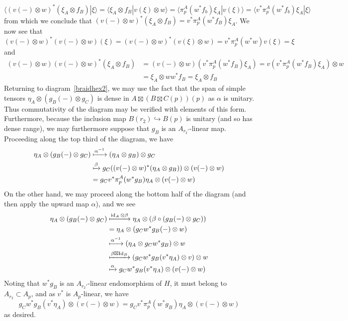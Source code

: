 \documentclass[11pt,reqno]{amsart}
\DeclareMathOperator{\id}{id}
\DeclareMathOperator{\Id}{Id}
\numberwithin{equation}{section}
\theoremstyle{plain}
\theoremstyle{definition}
\begin{document}
$$\langle (v(-)\otimes w)^*( \xi_A \otimes f_B)| \xi \rangle = \langle \xi_A \otimes f_B| v(\xi) \otimes w \rangle = \langle \pi_p^A(w^*f_b) \xi_A| v(\xi)\rangle = \langle v^* \pi_p^A(w^*f_b)\xi_A| \xi\rangle$$
from which we conclude that $(v(-)\otimes w)^*(\xi_A \otimes f_B)= v^*\pi_p^A(w^*f_B)\xi_A$. We now see that
$$(v(-)\otimes w)^*(v(-)\otimes w)(\xi)= (v(-)\otimes w)^*(v(\xi) \otimes w) =v^*\pi_p^A(w^*w)v(\xi)=\xi$$
and
\begin{align*}
    (v(-)\otimes w)(v(-)\otimes w)^*(\xi_A \otimes f_B)&= (v(-)\otimes w)(v^*\pi_p^A(w^*f_B)\xi_A)=v(v^*\pi_p^A(w^*f_B)\xi_A)\otimes w \\
    &= \xi_A \otimes ww^*f_B = \xi_A \otimes f_B
\end{align*}
Returning to diagram~\ref{braidhex2}, we may use the fact that the span of simple tensors $\eta_A \otimes (g_B(-) \otimes g_C)$ is dense in $A \boxtimes (B \boxtimes C(p))(p)$ as $\alpha$ is unitary. Thus commutativity of the diagram may be verified with elements of this form. Furthermore, because the inclusion map $B(r_2)\hookrightarrow B(p)$ is unitary (and so has dense range), we may furthermore suppose that $g_B$ is an $A_{r_2'}$-linear map. Proceeding along the top third of the diagram, we have
\begin{align*}
    \eta_A \otimes (g_B(-) \otimes g_C) &\xmapsto{\alpha^{-1}} (\eta_A \otimes g_B) \otimes g_C \\
    &\xmapsto{\beta}g_C((v(-)\otimes w)^*(\eta_A \otimes g_B)) \otimes (v(-)\otimes w) \\
    &=g_Cv^*\pi_p^A(w^*g_B)\eta_A \otimes (v(-) \otimes w)
\end{align*}
On the other hand, we may proceed along the bottom half of the diagram (and then apply the upward map $\alpha$), and we see
\begin{align*}
    \eta_A \otimes (g_B(-) \otimes g_C) &\xmapsto{\id_A \otimes \beta} \eta_A \otimes (\beta \circ (g_B(-) \otimes g_C)) \\
    &= \eta_A \otimes (g_Cw^*g_B(-) \otimes w)\\
    &\xmapsto{\alpha^{-1}} (\eta_A \otimes g_Cw^*g_B) \otimes w\\
    &\xmapsto{\beta \boxtimes \Id_B} (g_Cw^*g_B(v^*\eta_A) \otimes v) \otimes w \\
    &\xmapsto{\alpha} g_Cw^*g_B(v^*\eta_A) \otimes (v(-) \otimes w)
\end{align*}
Noting that $w^*g_B$ is an $A_{r_2'}$-linear endomorphism of $H$, it must belong to $A_{r_2}\subset A_p$, and as $v^*$ is $A_p$-linear, we have
$$g_Cw^*g_B(v^*\eta_A) \otimes (v(-) \otimes w)=g_Cv^*\pi_p^A(w^*g_B)\eta_A \otimes (v(-) \otimes w)$$
as desired.
\end{document}
